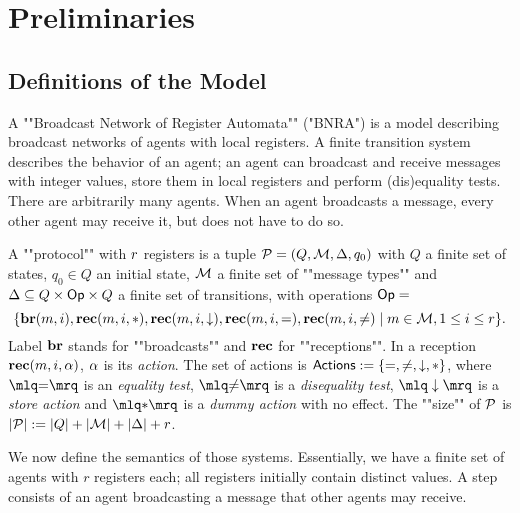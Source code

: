 \section{Preliminaries}
\label{sec:preliminaries}

\subsection{Definitions of the Model}
A ""Broadcast Network of Register Automata"" ("BNRA") \cite{DelzannoST13} is a model describing broadcast networks of agents with local registers. A finite transition system describes the behavior of an agent; an agent can broadcast and receive messages with integer values, store them in local registers and perform (dis)equality tests. 
There are arbitrarily many agents. When an agent broadcasts a message, every other agent may receive it, but does not have to do so. 


\begin{definition}
	A ""protocol"" with $r$ registers is a tuple $\mathcal{P} = (Q, \mathcal{M}, \Delta, q_0)$  with $Q$ a finite set of states, $q_0 \in Q$ an initial state, $\mathcal{M}$ a finite set of ""message types""  and $\Delta \subseteq Q \times \mathsf{Op} \times Q$ a finite set of transitions, with operations $\mathsf{Op} =$
	\[
	 \{\textbf{br}(m, i), \textbf{rec}(m, i, {*}), \textbf{rec}(m, i, \downarrow), \textbf{rec}(m, i, {=}), \textbf{rec}(m, i, {\ne}) \mid m \in \mathcal{M}, 1 \leq i \leq r\}.\]
	Label $\textbf{br}$ stands for ""broadcasts"" and $\textbf{rec}$ for ""receptions"".
	In a reception $\textbf{rec}(m, i, \alpha)$, $\alpha$ is its \emph{action}. 
The set of actions is $\mathsf{Actions} := \{{=}, {\ne}, \downarrow, {*}\}$, where 
$\quotemarks{\eqtestact}$ is an \emph{equality test}, $\quotemarks{\diseqtestact}$ is a \emph{disequality test}, $\quotemarks{\enregact}$ is a \emph{store action} and $\quotemarks{\dummyact}$ is a \emph{dummy action} with no effect.
The ""size"" of $\mathcal{P}$ is $|\mathcal{P}| := |Q| + |\mathcal{M}| + |\Delta| + r$.

\end{definition}

We now define the semantics of those systems. Essentially, we have a finite set of agents with $r$ registers each; all registers initially contain distinct values. A step consists of an agent broadcasting a message that other agents may receive.


